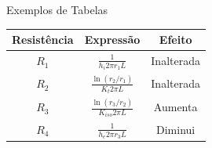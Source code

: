 \documentclass[c]{beamer}
\begin{document}
{\begin{frame}[fragile]{\sc Exemplos de Tabelas}
\begin{table}[h]
\begin{tabular}{c|c|c} 
				\toprule
				\textbf{Resistência}              &\textbf{Expressão}                                                       &\textbf{Efeito}                \\
				\midrule
				\multirow{2}{*}{$R_{1}$}           &\multirow{2}{*}{$\displaystyle\frac{1}{h_{i}2\pi r_{1}L}$}               &\multirow{2}{*}{Inalterada}    \\ 
				&                                                                         &                               \\ \hline 
				\multirow{2}{*}{$R_{2}$}           &\multirow{2}{*}{$\displaystyle\frac{\ln(r_{2}/r_{1})}{K_{t}2\pi L}$}     &\multirow{2}{*}{Inalterada}    \\ 
				&                                                                         &                               \\ \hline
				\multirow{2}{*}{$R_{3}$}           &\multirow{2}{*}{$\displaystyle\frac{\ln(r_{3}/r_{2})}{K_{iso}2\pi L}$}   &\multirow{2}{*}{Aumenta}       \\ 
				&                                                                         &                               \\ \hline
				\multirow{2}{*}{$R_{4}$}           &\multirow{2}{*}{$\displaystyle\frac{1}{h_{e}2\pi r_{3}L}$}               &\multirow{2}{*}{Diminui}       \\ 
				&                                                                         &                               \\ \hline
				\bottomrule
\end{tabular}
\end{table}
\end{frame}
	
}
\end{document}
